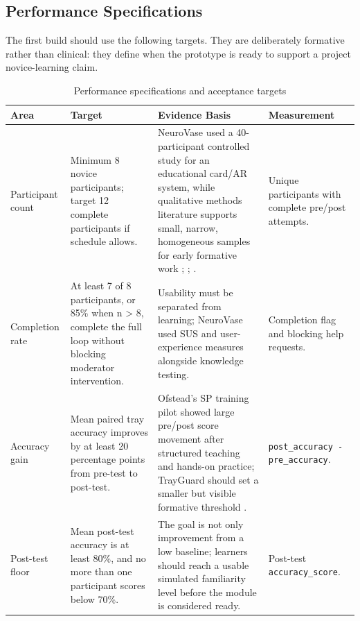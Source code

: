 \documentclass[10pt,a4paper]{article}
\begin{document}
\subsection{Performance Specifications}


The first build should use the following targets. They are deliberately
formative rather than clinical: they define when the prototype is ready to
support a project novice-learning claim.
\begin{table}[H]
\centering
\caption{Performance specifications and acceptance targets}
\label{tab:performance-specifications-and-acceptance-targets}
\small\renewcommand{\arraystretch}{1.2}\setlength{\tabcolsep}{4pt}
\begin{tabularx}{\textwidth}{|>{\raggedright\arraybackslash}X|>{\raggedright\arraybackslash}X|>{\raggedright\arraybackslash}X|>{\raggedright\arraybackslash}X|}
\hline
Area & Target & Evidence Basis & Measurement \\
\hline
Participant count & Minimum 8 novice participants; target 12 complete participants if schedule allows. & NeuroVase used a 40-participant controlled study for an educational card/AR system, while qualitative methods literature supports small, narrow, homogeneous samples for early formative work \cite{jahani-et-al-2026-neurovase}; \cite{malterud-et-al-2016}; \cite{hennink-and-kaiser-2022}. & Unique participants with complete pre/post attempts. \\
\hline
Completion rate & At least 7 of 8 participants, or 85\% when n > 8, complete the full loop without blocking moderator intervention. & Usability must be separated from learning; NeuroVase used SUS and user-experience measures alongside knowledge testing. & Completion flag and blocking help requests. \\
\hline
Accuracy gain & Mean paired tray accuracy improves by at least 20 percentage points from pre-test to post-test. & Ofstead's SP training pilot showed large pre/post score movement after structured teaching and hands-on practice; TrayGuard should set a smaller but visible formative threshold \cite{ofstead-et-al-2023}. & \texttt{post\_accuracy - pre\_accuracy}. \\
\hline
Post-test floor & Mean post-test accuracy is at least 80\%, and no more than one participant scores below 70\%. & The goal is not only improvement from a low baseline; learners should reach a usable simulated familiarity level before the module is considered ready. & Post-test \texttt{accuracy\_score}. \\
\hline

\end{tabularx}
\end{table}
\end{document}
